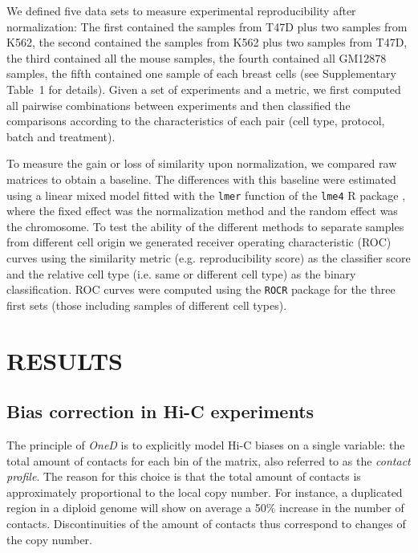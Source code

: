\documentclass[a4,center,fleqn]{NAR}
\begin{document}
We defined five data sets to measure experimental reproducibility after
normalization: The first contained the samples from T47D plus two samples
from K562, the second contained the samples from K562 plus two samples
from T47D, the third contained all the mouse samples, the fourth contained all
GM12878 samples, the fifth contained one sample of each breast cells (see Supplementary
Table~1 for details). Given a set of experiments and a metric, we first
computed all pairwise combinations between experiments and then classified
the comparisons according to the characteristics of each pair (cell type,
protocol, batch and treatment).

To measure the gain or loss of similarity upon normalization, we compared
raw matrices to obtain a baseline. The differences with this baseline were
estimated using a linear mixed model fitted with the \texttt{lmer}
function of the \texttt{lme4} R package \citep{bates2015lme4}, where the
fixed effect was the normalization method and the random effect was the
chromosome. To test the ability of the different methods to separate samples
from different cell origin we generated receiver operating characteristic (ROC) curves
using the similarity metric (e.g. reproducibility score) as the classifier score
and the relative cell type (i.e. same or different cell type) as the binary
classification. ROC curves were computed using the \texttt{ROCR} package
\citep{sing2005rocr} for the three first sets (those including samples of
different cell types).

\section{RESULTS}

\subsection{Bias correction in Hi-C experiments}

The principle of \textit{OneD} is to explicitly model Hi-C biases on a
single variable: the total amount of contacts for each bin of the matrix,
also referred to as the \textit{contact profile}. The reason for this
choice is that the total amount of contacts is approximately proportional
to the local copy number. For instance, a duplicated region in a diploid
genome will show on average a 50\% increase in the number of contacts.
Discontinuities of the amount of contacts thus correspond to changes of
the copy number.
\end{document}
